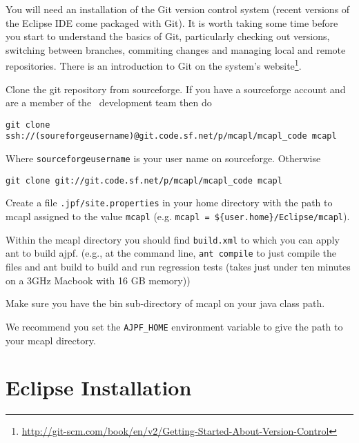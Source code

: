 You will need an installation of the Git version control system (recent versions of the Eclipse IDE come packaged with Git).  It is worth taking some time before you start to understand the basics of Git, particularly checking out versions, switching between branches, commiting changes and managing local and remote repositories.  There is an introduction to Git on the system's website\footnote{\url{http://git-scm.com/book/en/v2/Getting-Started-About-Version-Control}}.

\begin{itemize}
\begin{sloppypar}
\item Clone the git repository from sourceforge.  If you have a sourceforge account and are a member of the \ajpf\ development team then do
\begin{small}
\begin{verbatim}
git clone ssh://(soureforgeusername)@git.code.sf.net/p/mcapl/mcapl_code mcapl
\end{verbatim}
\end{small}
Where \texttt{sourceforgeusername} is your user name on sourceforge.  Otherwise
\begin{verbatim}
git clone git://git.code.sf.net/p/mcapl/mcapl_code mcapl
\end{verbatim}
\end{sloppypar}
\item Create a file \texttt{.jpf/site.properties} in your home directory with the path to mcapl assigned to the value \texttt{mcapl} (e.g. \texttt{mcapl = \$\{user.home\}/Eclipse/mcapl}).
\item Within the mcapl directory you should find \texttt{build.xml} to which you can apply ant to build ajpf. (e.g., at the command line, \lstinline{ant compile} to just compile the files and ant build to build and run regression tests (takes just under ten minutes on a 3GHz Macbook with 16 GB memory))
\item Make sure you have the bin sub-directory of mcapl on your java class path.
\item We recommend you set the \texttt{AJPF\_HOME} environment variable to give the path to your mcapl directory.
\end{itemize}

\section{Eclipse Installation}

